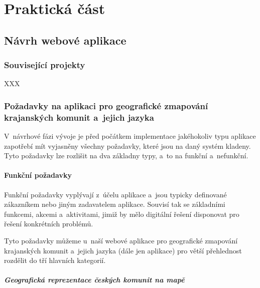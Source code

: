 \part{Praktická část}

\hypertarget{nuxe1vrh-webovuxe9-aplikace}{%
\chapter{Návrh webové aplikace}\label{nuxe1vrh-webovuxe9-aplikace}}

\hypertarget{souvisejuxedcuxed-projekty}{%
\section{Související projekty}\label{souvisejuxedcuxed-projekty}}

XXX

\hypertarget{poux17eadavky-na-aplikaci-pro-geografickuxe9-zmapovuxe1nuxed-krajanskuxfdch-komunit-a-jejich-jazyka}{%
\section{Požadavky na aplikaci pro geografické zmapování krajanských komunit a~jejich jazyka}\label{poux17eadavky-na-aplikaci-pro-geografickuxe9-zmapovuxe1nuxed-krajanskuxfdch-komunit-a-jejich-jazyka}}

V~návrhové fázi vývoje je před počátkem implementace jakéhokoliv typu aplikace zapotřebí mít vyjasněny všechny požadavky, které jsou na daný systém kladeny. Tyto požadavky lze rozlišit na dva základny typy, a~to na funkční a~nefunkční.

\hypertarget{funkux10dnuxed-poux17eadavky}{%
\subsection{Funkční požadavky}\label{funkux10dnuxed-poux17eadavky}}

Funkční požadavky vyplývají z~účelu aplikace a~jsou typicky definované zákazníkem nebo jiným zadavatelem aplikace. Souvisí tak se základními funkcemi, akcemi a~aktivitami, jimiž by mělo digitální řešení disponovat pro řešení konkrétních problémů\parencite{Gorton2006}.

Tyto požadavky můžeme u~naší webové aplikace pro geografické zmapování krajanských komunit a~jejich jazyka (dále jen aplikace) pro větší přehlednost rozdělit do tří hlavních kategorií.

\hypertarget{geografickuxe1-reprezentace-ux10deskuxfdch-komunit-na-mapux11b}{%
\subsubsection{Geografická reprezentace českých komunit na mapě}\label{geografickuxe1-reprezentace-ux10deskuxfdch-komunit-na-mapux11b}}

